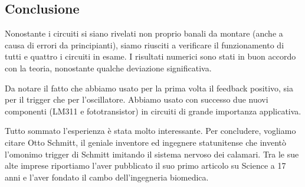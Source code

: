 \subsection{Conclusione}

Nonostante i circuiti si siano rivelati non proprio banali da montare (anche a causa di errori
da principianti), siamo riusciti a verificare il funzionamento di tutti e quattro i circuiti in esame.
I risultati numerici sono stati in buon accordo con la teoria, nonostante qualche deviazione significativa.

Da notare il fatto che abbiamo usato per la prima volta il feedback positivo, sia per il trigger che
per l'oscillatore. Abbiamo usato con successo due nuovi componenti (LM311 e fototransistor) in circuiti
di grande importanza applicativa.

Tutto sommato l'esperienza è stata molto interessante. Per concludere, vogliamo citare Otto Schmitt, il
geniale inventore ed ingegnere statunitense che inventò l'omonimo trigger di Schmitt imitando il sistema
nervoso dei calamari. Tra le sue alte imprese riportiamo l'aver pubblicato il suo primo articolo su Science
a 17 anni e l'aver fondato il cambo dell'ingegneria biomedica.
